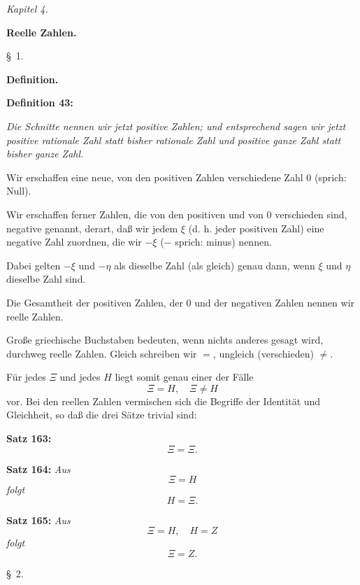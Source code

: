 
\line{}\baselineskip
\centerline{\sl Kapitel 4.}
\medskip

\centerline{\bf Reelle Zahlen.}
\bigskip

\centerline{{\S}~1.}
\medskip

\centerline{\bf Definition.}
\bigskip

{\bf Definition 43:} {\it Die Schnitte nennen wir jetzt positive Zahlen;
und entsprechend sagen wir jetzt positive rationale Zahl statt bisher
rationale Zahl und positive ganze Zahl statt bisher ganze Zahl.

Wir erschaffen eine neue, von den positiven Zahlen verschiedene
Zahl $0$ {\rm (sprich: Null).}

Wir erschaffen ferner Zahlen, die von den positiven und von $0$
verschieden sind, negative genannt, derart, da{\ss} wir jedem $\xi$ {\rm (d. h. jeder
positiven Zahl)} eine negative Zahl zuordnen, die wir $-\xi$ {\rm ($-$ sprich:
minus)} nennen.

Dabei gelten $-\xi$ und $-\eta$ als dieselbe Zahl (als gleich) genau
dann, wenn $\xi$ und $\eta$ dieselbe Zahl sind.

Die Gesamtheit der positiven Zahlen, der $0$ und der negativen
Zahlen nennen wir reelle Zahlen.}

Gro{\ss}e griechische Buchstaben bedeuten, wenn nichts anderes
gesagt wird, durchweg reelle Zahlen.  Gleich schreiben wir $=$,
ungleich (verschieden) $\ne$.

\ifx\Alpha\undefined
  \let\Alpha=A \let\Beta=B \let\Zeta=Z \let\Eta=H \let\Upsilon=Y
\fi

F\"ur jedes $\Xi$ und jedes $\Eta$ liegt somit genau einer der F\"alle
$$\Xi = \Eta,\quad \Xi \ne \Eta$$
vor.  Bei den reellen Zahlen vermischen sich die Begriffe der
Identit\"at und Gleichheit, so da{\ss} die drei S\"atze trivial sind:
\medskip


{\bf Satz 163:} {\it $$\Xi = \Xi.$$}%
\medskip


{\bf Satz 164:} {\it Aus
$$\Xi = \Eta$$
folgt
$$\Eta = \Xi.$$}%
\medskip


{\bf Satz 165:} {\it Aus
$$\Xi = \Eta,\quad \Eta = \Zeta$$
folgt
$$\Xi = \Zeta.$$}%
\vfill\eject


\line{}\baselineskip
\centerline{{\S}~2.}
\medskip

